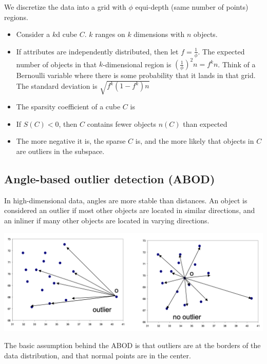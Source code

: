     We discretize the data into a grid with $\phi$ equi-depth (same number of points) regions. 
    \begin{itemize}
        \item Consider a $k$d cube $C$. $k$ ranges on $k$ dimensions with $n$ objects. 
        \item If attributes are independently distributed, then let $f = \frac{1}{\phi}$. The expected number of objects in that $k$-dimensional region is $(\frac{1}{\phi})^2n = f^kn$. Think of a Bernoulli variable where there is some probability that it lands in that grid. The standard deviation is $\sqrt{f^k(1-f^k)n}$
        \item The sparsity coefficient of a cube $C$ is 
        \item If $S(C) < 0$, then $C$ contains fewer objects $n(C)$ than expected
        \item The more negative it is, the sparse $C$ is, and the more likely that objects in $C$ are outliers in the subspace.
    \end{itemize}

\subsection{Angle-based outlier detection (ABOD)}
    In high-dimensional data, angles are more stable than distances. An object is considered an outlier if most other objects are located in similar directions, and an inliner if many other objects are located in varying directions.
    
    \begin{center}
        \includegraphics[width=1\textwidth]{images/angles.png}
    \end{center}
    
    The basic assumption behind the ABOD is that outliers are at the borders of the data distribution, and that normal points are in the center.
    
